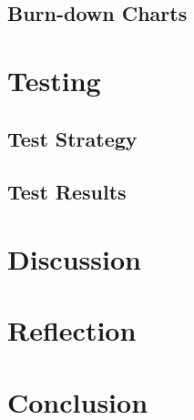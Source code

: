 \documentclass[a4paper,11pt]{article}
\begin{document}
\subsection{Burn-down Charts}


\pagebreak
\section{Testing}


\subsection{Test Strategy}


\subsection{Test Results}


\pagebreak
\section{Discussion}


\pagebreak
\section{Reflection}


\pagebreak
\section{Conclusion}


\pagebreak


\pagebreak
\appendix
\end{document}
